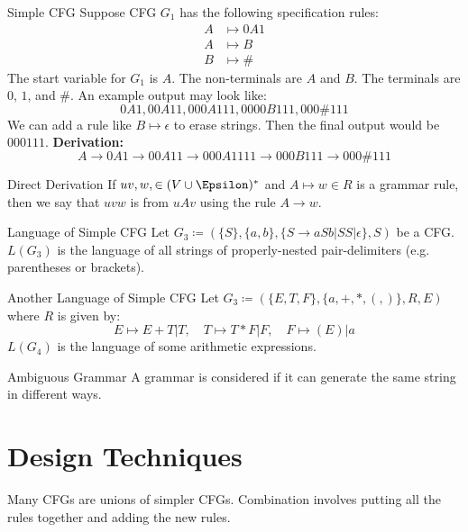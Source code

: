 \documentclass[12pt]{report}
\begin{document}
\begin{exbox}{Simple CFG}{}
    Suppose CFG $G_1$ has the following specification rules:
    \begin{align*}
        A &\mapsto 0A1 \\
        A &\mapsto B \\
        B &\mapsto \#
    \end{align*}
    The start variable for $G_1$ is $A$. The non-terminals are $A$ and $B$. The terminals are $0$, $1$, and $\#$. An example output may look like:
    \[ 0A1, 00A11, 000A111, 0000B111, 000\#111 \]
    We can add a rule like $B \mapsto \epsilon$ to erase strings. Then the final output would be $000111$.
    \tcblower
    \textbf{Derivation:}
    \[ A \to 0A1 \to 00A11 \to 000A1111 \to 000B111 \to 000\#111 \]
\end{exbox}

\begin{dfnbox}{Direct Derivation}{}
    If $uv,w, \in (V \cup \Epsilon)^*$ and $A \mapsto w \in R$ is a grammar rule, then we say that $uvw$ is  from $uAv$ using the rule $A \to w$.
\end{dfnbox}

\begin{exbox}{Language of Simple CFG}{}
    Let $G_3 \coloneq (\{S\}, \{a,b\}, \{S \to aSb | SS | \epsilon\}, S)$ be a CFG. $L(G_3)$ is the language of all strings of properly-nested pair-delimiters (e.g. parentheses or brackets).
\end{exbox}

\begin{exbox}{Another Language of Simple CFG}{}
    Let $G_3 \coloneq (\{E,T,F\}, \{a, +, *, (, )\}, R, E)$ where $R$ is given by:
    \[ E \mapsto E + T | T,\quad T \mapsto T * F | F,\quad F \mapsto (E) | a \]
    $L(G_4)$ is the language of some arithmetic expressions.
\end{exbox}

\begin{dfnbox}{Ambiguous Grammar}{}
    A grammar is considered  if it can generate the same string in different ways.
\end{dfnbox}

\section{Design Techniques}
Many CFGs are unions of simpler CFGs. Combination involves putting all the rules together and adding the new rules.



\amzindex
\end{document}
